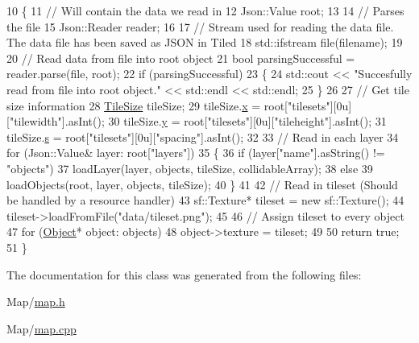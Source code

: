\begin{DoxyCode}
10 \{
11     \textcolor{comment}{// Will contain the data we read in}
12     Json::Value root;
13 
14     \textcolor{comment}{// Parses the file}
15     Json::Reader reader;
16 
17     \textcolor{comment}{// Stream used for reading the data file. The data file has been saved as JSON in Tiled}
18     std::ifstream file(filename);
19 
20     \textcolor{comment}{// Read data from file into root object}
21     \textcolor{keywordtype}{bool} parsingSuccessful = reader.parse(file, root);
22     \textcolor{keywordflow}{if} (parsingSuccessful)
23     \{
24         std::cout << \textcolor{stringliteral}{"Succesfully read from file into root object."} << std::endl << std::endl;
25     \}
26 
27     \textcolor{comment}{// Get tile size information}
28     \hyperlink{structTileSize}{TileSize} tileSize;
29     tileSize.\hyperlink{structTileSize_add80f453cede5e47fc0c598c1660e174}{x} = root[\textcolor{stringliteral}{"tilesets"}][0u][\textcolor{stringliteral}{"tilewidth"}].asInt();
30     tileSize.\hyperlink{structTileSize_a1ee6672b06f91d6100c93e6664ada05e}{y} = root[\textcolor{stringliteral}{"tilesets"}][0u][\textcolor{stringliteral}{"tileheight"}].asInt();
31     tileSize.\hyperlink{structTileSize_ad2b8b0f1bf57c2d662533a870e0fc2a6}{s} = root[\textcolor{stringliteral}{"tilesets"}][0u][\textcolor{stringliteral}{"spacing"}].asInt();
32 
33     \textcolor{comment}{// Read in each layer}
34     \textcolor{keywordflow}{for} (Json::Value& layer: root[\textcolor{stringliteral}{"layers"}])
35     \{
36         \textcolor{keywordflow}{if} (layer[\textcolor{stringliteral}{"name"}].asString() != \textcolor{stringliteral}{"objects"})
37             loadLayer(layer, objects, tileSize, collidableArray);
38         \textcolor{keywordflow}{else}
39             loadObjects(root, layer, objects, tileSize);
40     \}
41 
42     \textcolor{comment}{// Read in tileset (Should be handled by a resource handler)}
43     sf::Texture* tileset = \textcolor{keyword}{new} sf::Texture();
44     tileset->loadFromFile(\textcolor{stringliteral}{"data/tileset.png"});
45 
46     \textcolor{comment}{// Assign tileset to every object}
47     \textcolor{keywordflow}{for} (\hyperlink{classObject}{Object}* \textcolor{keywordtype}{object}: objects)
48         \textcolor{keywordtype}{object}->texture = tileset;
49 
50     \textcolor{keywordflow}{return} \textcolor{keyword}{true};
51 \}
\end{DoxyCode}


The documentation for this class was generated from the following files\+:\begin{DoxyCompactItemize}
\item 
Map/\hyperlink{map_8h}{map.\+h}\item 
Map/\hyperlink{map_8cpp}{map.\+cpp}\end{DoxyCompactItemize}
